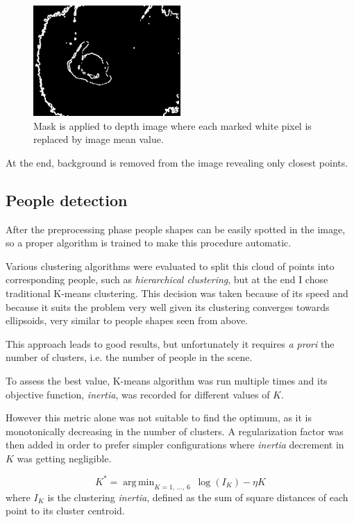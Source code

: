 \documentclass[a4paper]{article}
\DeclareMathOperator*{\argmin}{arg\,min}
\begin{document}
\begin{figure}[htp]
  \centering
  \vspace{-0.5cm}\includegraphics[width=0.5\textwidth]{results/border_mask.png}
  \caption{Mask is applied to depth image where each marked white pixel is replaced by image mean value.}
  \label{fig:border_mask}
\end{figure}

At the end, background is removed from the image revealing only closest points.

\subsection*{People detection}
After the preprocessing phase people shapes can be easily spotted in the image, so a proper algorithm is trained to make this procedure automatic.

Various clustering algorithms were evaluated to split this cloud of points into corresponding people, such as \emph{hierarchical clustering}, but at the end I chose traditional K-means clustering.
This decision was taken because of its speed and because it suits the problem very well given its clustering converges towards ellipsoids, very similar to people shapes seen from above.

This approach leads to good results, but unfortunately it requires \emph{a prori} the number of clusters, i.e. the number of people in the scene.

To assess the best value, K-means algorithm was run multiple times and its objective function, \emph{inertia}, was recorded for different values of $K$.

However this metric alone was not suitable to find the optimum, as it is monotonically decreasing in the number of clusters.
A regularization factor was then added in order to prefer simpler configurations where \emph{inertia} decrement in $K$ was getting negligible.

\begin{equation*}
  K^* = \argmin_{K = 1,\, \ldots,\, 6} ~  \log(I_K) - \eta K
\end{equation*}
where $I_K$ is the clustering \emph{inertia}, defined as the sum of square distances of each point to its cluster centroid.
\end{document}
